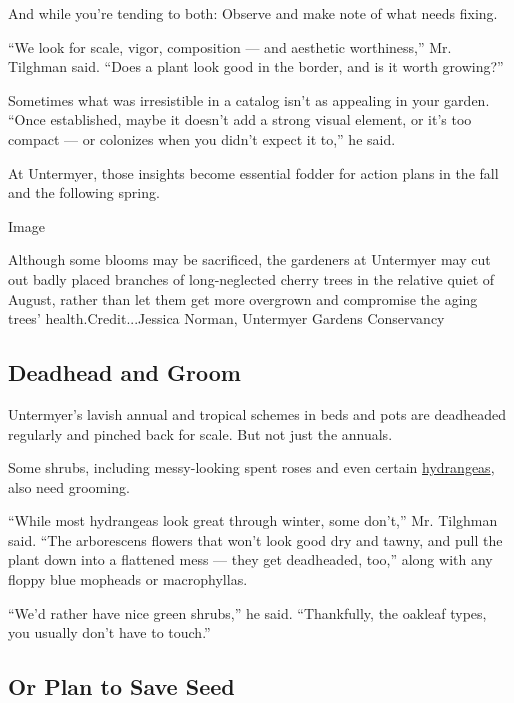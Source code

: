 And while you're tending to both: Observe and make note of what needs
fixing.

``We look for scale, vigor, composition --- and aesthetic worthiness,''
Mr. Tilghman said. ``Does a plant look good in the border, and is it
worth growing?''

Sometimes what was irresistible in a catalog isn't as appealing in your
garden. ``Once established, maybe it doesn't add a strong visual
element, or it's too compact --- or colonizes when you didn't expect it
to,'' he said.

At Untermyer, those insights become essential fodder for action plans in
the fall and the following spring.

Image

Although some blooms may be sacrificed, the gardeners at Untermyer may
cut out badly placed branches of long-neglected cherry trees in the
relative quiet of August, rather than let them get more overgrown and
compromise the aging trees' health.Credit...Jessica Norman, Untermyer
Gardens Conservancy

\hypertarget{deadhead-and-groom}{%
\subsection{Deadhead and Groom}\label{deadhead-and-groom}}

Untermyer's lavish annual and tropical schemes in beds and pots are
deadheaded regularly and pinched back for scale. But not just the
annuals.

Some shrubs, including messy-looking spent roses and even certain
\href{https://www.nytimes3xbfgragh.onion/2020/07/01/realestate/how-to-grow-hydrangea-uncommon-varieties.html/}{hydrangeas},
also need grooming.

``While most hydrangeas look great through winter, some don't,'' Mr.
Tilghman said. ``The arborescens flowers that won't look good dry and
tawny, and pull the plant down into a flattened mess --- they get
deadheaded, too,'' along with any floppy blue mopheads or macrophyllas.

``We'd rather have nice green shrubs,'' he said. ``Thankfully, the
oakleaf types, you usually don't have to touch.''

\hypertarget{or-plan-to-save-seed}{%
\subsection{Or Plan to Save Seed}\label{or-plan-to-save-seed}}

